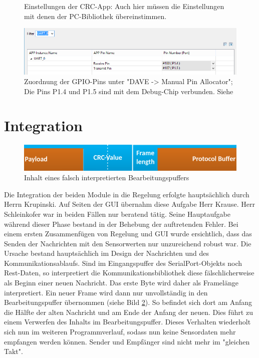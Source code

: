 \begin{figure}[!h]
\begin{minipage}{0.4\textwidth}
    \caption{Einstellungen der CRC-App: Auch hier müssen die Einstellungen mit denen der PC-Bibliothek übereinstimmen.}
  \end{minipage}
  \begin{minipage}{0.4\textwidth}
    \centering
    \includegraphics[width=\textwidth]{PinAlloc}
    \caption{Zuordnung der GPIO-Pins unter "DAVE -> Manual Pin Allocator"; Die Pins P1.4 und P1.5 sind mit dem Debug-Chip verbunden. Siehe \cite[Table 5]{boardMan}}
    \label{fig:dave6}
  \end{minipage}
\end{figure}
\newpage
\section{Integration}
\begin{figure}
  \includegraphics[width=\textwidth]{WorkBufferFail}
  \caption{Inhalt eines falsch interpretierten Bearbeitungspuffers}
  \label{fig:FrameFail}
\end{figure}
Die Integration der beiden Module in die Regelung erfolgte hauptsächlich durch Herrn Krupinski. Auf Seiten der GUI übernahm diese Aufgabe Herr Krause. Herr Schleinkofer war in beiden Fällen nur beratend tätig. Seine Hauptaufgabe während dieser Phase bestand in der Behebung der auftretenden Fehler. Bei einem ersten Zusammenfügen von Regelung und GUI wurde ersichtlich, dass das Senden der Nachrichten mit den Sensorwerten nur unzureichend robust war. Die Ursache bestand hauptsächlich im Design der Nachrichten und des Kommunikationsablaufs. Sind im Eingangspuffer des SerialPort-Objekts noch Rest-Daten, so interpretiert die Kommunikationsbibliothek diese fälschlicherweise als Beginn einer neuen Nachricht. Das erste Byte wird daher als Framelänge interpretiert. Ein neuer Frame wird dann nur unvollständig in den Bearbeitungspuffer übernommen (siehe Bild \ref{fig:FrameFail}). So befindet sich dort am Anfang die Hälfte der alten Nachricht und am Ende der Anfang der neuen. Dies führt zu einem Verwerfen des Inhalts im Bearbeitungspuffer. Dieses Verhalten wiederholt sich nun im weiteren Programmverlauf, sodass nun keine Sensordaten mehr empfangen werden können. Sender und Empfänger sind nicht mehr im "gleichen Takt". 

